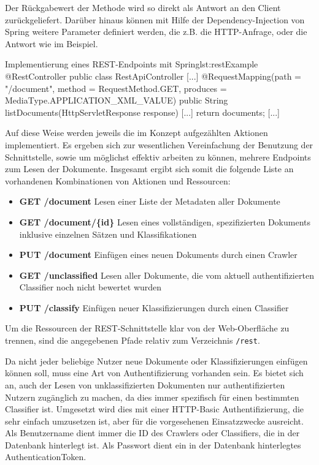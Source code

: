 Der Rückgabewert der Methode wird so direkt als Antwort an den Client zurückgeliefert.
Darüber hinaus können mit Hilfe der Dependency-Injection von Spring weitere Parameter
definiert werden, die z.B. die HTTP-Anfrage, oder die Antwort wie im Beispiel.
\vspace{1em}

\begin{java}{Implementierung eines REST-Endpoints mit Spring}{lst:restExample}
@RestController
public class RestApiController {
	[...]
	@RequestMapping(path = "/document", method = RequestMethod.GET, produces = MediaType.APPLICATION_XML_VALUE)
	public String listDocuments(HttpServletResponse response) {
		[...]
		return documents;
	}
	[...]
}
\end{java}

Auf diese Weise werden jeweils die im Konzept aufgezählten Aktionen implementiert.
Es ergeben sich zur wesentlichen Vereinfachung der Benutzung der Schnittstelle,
sowie um möglichst effektiv arbeiten zu können, mehrere Endpoints zum Lesen
der Dokumente. Insgesamt ergibt sich somit die folgende Liste an vorhandenen
Kombinationen von Aktionen und Ressourcen:

\begin{itemize}
	\item \textbf{GET /document}
	Lesen einer Liste der Metadaten aller Dokumente
	\item \textbf{GET /document/\{id\}}
	Lesen eines vollständigen, spezifizierten Dokuments inklusive
	einzelnen Sätzen und Klassifikationen
	\item \textbf{PUT /document}
	Einfügen eines neuen Dokuments durch einen Crawler
	\item \textbf{GET /unclassified}
	Lesen aller Dokumente, die vom aktuell authentifizierten Classifier
	noch nicht bewertet wurden
	\item \textbf{PUT /classify}
	Einfügen neuer Klassifizierungen durch einen Classifier
\end{itemize}

Um die Ressourcen der REST-Schnittstelle klar von der Web-Oberfläche zu trennen,
sind die angegebenen Pfade relativ zum Verzeichnis \texttt{/rest}.

Da nicht jeder beliebige Nutzer neue Dokumente oder Klassifizierungen einfügen
können soll, muss eine Art von Authentifizierung vorhanden sein.
Es bietet sich an, auch der Lesen von unklassifizierten Dokumenten nur authentifizierten
Nutzern zugänglich zu machen, da dies immer spezifisch
für einen bestimmten Classifier ist.
Umgesetzt wird dies mit einer HTTP-Basic Authentifizierung, die sehr einfach umzusetzen
ist, aber für die vorgesehenen Einsatzzwecke ausreicht.
Als Benutzername dient immer die ID des Crawlers oder Classifiers, die in der Datenbank hinterlegt ist. Als Passwort dient ein in der Datenbank hinterlegtes AuthenticationToken.


